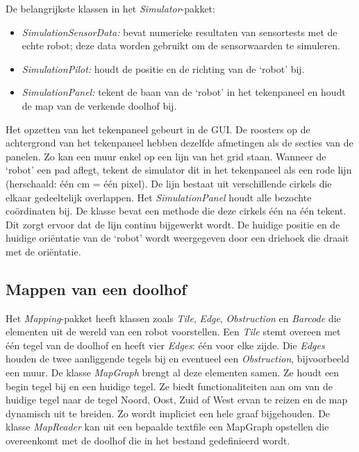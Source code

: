 \documentclass[eind]{penoverslag}
\begin{document}
De belangrijkste klassen in het \textit{Simulator}-pakket:

\begin{itemize}
\item \textit{SimulationSensorData:} bevat numerieke resultaten van sensortests met de echte robot; deze data worden gebruikt om de sensorwaarden te simuleren.
\item \textit{SimulationPilot:} houdt de positie en de richting van de `robot' bij.
\item \textit{SimulationPanel:} tekent de baan van de `robot' in het tekenpaneel en houdt de map van de verkende doolhof bij.
\end{itemize}

Het opzetten van het tekenpaneel gebeurt in de GUI. De roosters op de achtergrond van het tekenpaneel hebben dezelfde afmetingen als de secties van de panelen. Zo kan een muur enkel op een lijn van het grid staan.
Wanneer de `robot' een pad aflegt, tekent de simulator dit in het tekenpaneel als een rode lijn (herschaald: \'e\'en cm = \'e\'en pixel). De lijn  bestaat uit verschillende cirkels die elkaar gedeeltelijk overlappen. Het \textit{SimulationPanel} houdt alle bezochte co\"ordinaten bij. De klasse bevat een methode die deze cirkels \'e\'en na \'e\'en tekent. Dit zorgt ervoor dat de lijn continu bijgewerkt wordt. De huidige positie en de huidige ori\"entatie van de `robot' wordt weergegeven door een driehoek die draait met de ori\"entatie.

\subsection{Mappen van een doolhof} %
\label{ssec:mapping}
Het \textit{Mapping}-pakket heeft klassen zoals \textit{Tile}, \textit{Edge}, \textit{Obstruction} en \textit{Barcode} die elementen uit de wereld van een robot voorstellen. Een \textit{Tile} stemt overeen met \'e\'en tegel van de doolhof en heeft vier \textit{Edges}: \'e\'en voor elke zijde. Die \textit{Edges} houden de twee aanliggende tegels bij en eventueel een \textit{Obstruction}, bijvoorbeeld een muur. De klasse \textit{MapGraph} brengt al deze elementen samen. Ze houdt een begin tegel bij en een huidige tegel. Ze biedt functionaliteiten aan om van de huidige tegel naar de tegel Noord, Oost, Zuid of West ervan te reizen en de map dynamisch uit te breiden. Zo wordt impliciet een hele graaf bijgehouden. De klasse \textit{MapReader} kan uit een bepaalde textfile een MapGraph opstellen die overeenkomt met de doolhof die in het bestand gedefinieerd wordt.\\
\end{document}
